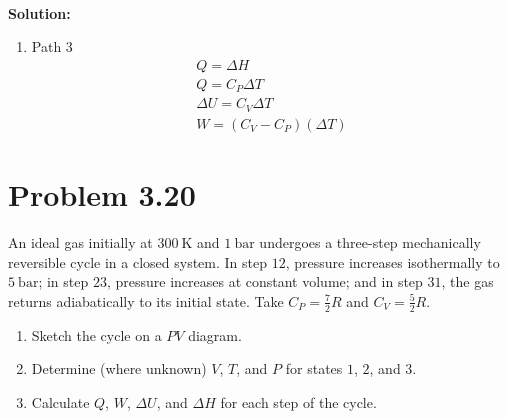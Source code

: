 \documentclass{article}
\newcommand*\widefbox[1]{\fbox{\vspace{0.5em}\hspace{2em}#1\hspace{2em}\vspace{0.5em}}}
\newenvironment{solution}{\par\noindent\textbf{\\Solution:\\}}{\par\medskip}
\begin{document}
\begin{solution}
\begin{enumerate}[label=(\alph*)]
\begin{enumerate}[label=\roman*.]
        \item Path 3
          \begin{gather*}
            Q=\Delta H\\
            Q=C_{P}\Delta T\\
            \Delta U=C_{V}\Delta T\\
            W=\left( C_{V}-C_{P} \right)\left( \Delta T \right)
          \end{gather*}
      \end{enumerate}
  \end{enumerate}
\end{solution}

\section*{Problem 3.20}
An ideal gas initially at $\SI{300}{\kelvin}$ and $\SI{1}{\bar}$
undergoes a three-step mechanically reversible cycle in a closed
system. In step $12$, pressure increases isothermally to
$\SI{5}{\bar}$; in step $23$, pressure increases at constant volume;
and in step $31$, the gas returns adiabatically to its initial state.
Take $C_P = \frac{7}{2}R$ and $C_V = \frac{5}{2}R$.
\begin{enumerate}[label=(\alph*)]
  \item Sketch the cycle on a $PV$ diagram.
  \item Determine (where unknown) $V$, $T$, and $P$ for states $1$,
    $2$, and $3$.
  \item Calculate $Q$, $W$, $\Delta U$, and $\Delta H$ for each step
    of the cycle.
\end{enumerate}
\end{document}
